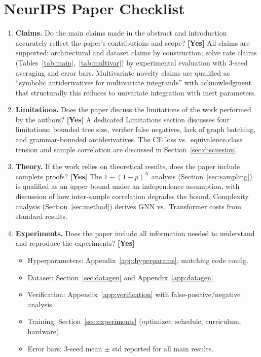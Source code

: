 \documentclass{article}
\begin{document}
\section{NeurIPS Paper Checklist}
\label{app:checklist}

\begin{enumerate}

\item \textbf{Claims.}
Do the main claims made in the abstract and introduction accurately reflect the paper's contributions and scope?
\textbf{[Yes]} All claims are supported: architectural and dataset claims by construction; solve rate claims (Tables~\ref{tab:main},~\ref{tab:multivar}) by experimental evaluation with 3-seed averaging and error bars. Multivariate novelty claims are qualified as ``symbolic antiderivatives for multivariate integrands'' with acknowledgment that structurally this reduces to univariate integration with inert parameters.

\item \textbf{Limitations.}
Does the paper discuss the limitations of the work performed by the authors?
\textbf{[Yes]} A dedicated Limitations section discusses four limitations: bounded tree size, verifier false negatives, lack of graph batching, and grammar-bounded antiderivatives. The CE loss vs.\ equivalence class tension and sample correlation are discussed in Section~\ref{sec:discussion}.

\item \textbf{Theory.}
If the work relies on theoretical results, does the paper include complete proofs?
\textbf{[Yes]} The $1-(1-p)^N$ analysis (Section~\ref{sec:sampling}) is qualified as an upper bound under an independence assumption, with discussion of how inter-sample correlation degrades the bound. Complexity analysis (Section~\ref{sec:method}) derives GNN vs.\ Transformer costs from standard results.

\item \textbf{Experiments.}
Does the paper include all information needed to understand and reproduce the experiments?
\textbf{[Yes]}
\begin{itemize}
	\item Hyperparameters: Appendix~\ref{app:hyperparams}, matching code config.
	\item Dataset: Section~\ref{sec:datagen} and Appendix~\ref{app:datagen}.
	\item Verification: Appendix~\ref{app:verification} with false-positive/negative analysis.
	\item Training: Section~\ref{sec:experiments} (optimizer, schedule, curriculum, hardware).
	\item Error bars: $3$-seed mean $\pm$ std reported for all main results.
\end{itemize}


\end{enumerate}
\end{document}
